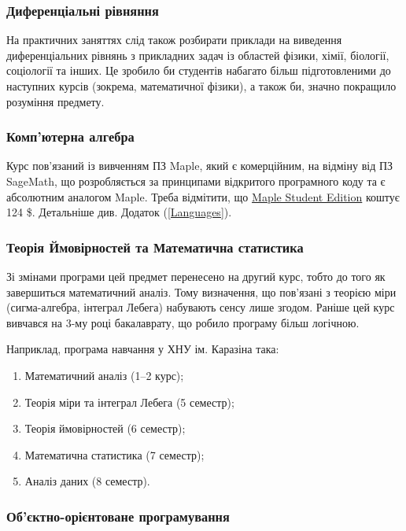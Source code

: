 \documentclass[14pt, a4paper]{extarticle}  %
\begin{document}
\subsubsection{Диференціальні рівняння}

На практичних заняттях слід також розбирати приклади на виведення диференціальних рівнянь з прикладних задач із областей фізики, хімії, біології, соціології та інших. Це зробило би студентів набагато більш підготовленими до наступних курсів (зокрема, математичної фізики), а також би, значно покращило розуміння предмету.

\subsubsection{Комп'ютерна алгебра}

Курс пов'язаний із вивченням ПЗ Maple, який є комерційним, на відміну від ПЗ SageMath, що розробляється за принципами відкритого програмного коду та є абсолютним аналогом Maple. Треба відмітити, що \href{https://webstore.maplesoft.com/catalog.aspx}{Maple Student Edition} коштує 124 \$. Детальніше див. Додаток (\ref{Languages}). 

\subsubsection{Теорія Ймовірностей та Математична статистика}

Зі змінами програми цей предмет перенесено на другий курс, тобто до того як завершиться математичний аналіз. Тому визначення, що пов'язані з теорією міри (сигма-алгебра, інтеграл Лебега) набувають сенсу лише згодом. Раніше цей курс вивчався на 3-му році бакалаврату, що робило програму більш логічною. 

Наприклад, програма навчання у ХНУ ім. Каразіна така:
\begin{enumerate}
    \item Математичний аналіз (1--2 курс);
    \item Теорія міри та інтеграл Лебега (5 семестр);
    \item Теорія ймовірностей (6 семестр);
    \item Математична статистика (7 семестр);
    \item Аналіз даних (8 семестр).
\end{enumerate}

\subsubsection{Об'єктно-орієнтоване програмування}
 
\end{document}
